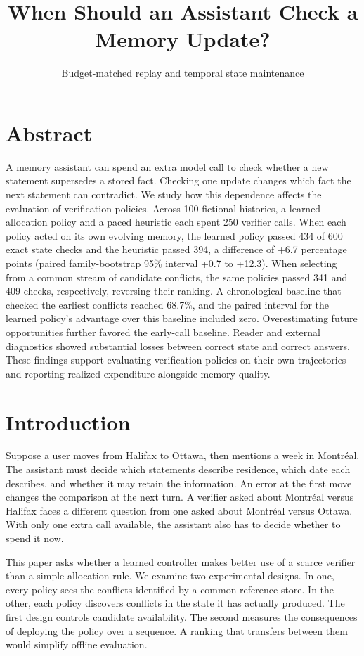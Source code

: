 \documentclass[
  11pt,
]{article}
\title{When Should an Assistant Check a Memory Update?}
\subtitle{Budget-matched replay and temporal state maintenance}
\author{}
\date{}
\begin{document}
\maketitle

\section{Abstract}\label{abstract}

A memory assistant can spend an extra model call to check whether a new
statement supersedes a stored fact. Checking one update changes which
fact the next statement can contradict. We study how this dependence
affects the evaluation of verification policies. Across 100 fictional
histories, a learned allocation policy and a paced heuristic each spent
250 verifier calls. When each policy acted on its own evolving memory,
the learned policy passed 434 of 600 exact state checks and the
heuristic passed 394, a difference of +6.7 percentage points (paired
family-bootstrap 95\% interval +0.7 to +12.3). When selecting from a
common stream of candidate conflicts, the same policies passed 341 and
409 checks, respectively, reversing their ranking. A chronological
baseline that checked the earliest conflicts reached 68.7\%, and the
paired interval for the learned policy's advantage over this baseline
included zero. Overestimating future opportunities further favored the
early-call baseline. Reader and external diagnostics showed substantial
losses between correct state and correct answers. These findings support
evaluating verification policies on their own trajectories and reporting
realized expenditure alongside memory quality.

\section{Introduction}\label{introduction}

Suppose a user moves from Halifax to Ottawa, then mentions a week in
Montréal. The assistant must decide which statements describe residence,
which date each describes, and whether it may retain the information. An
error at the first move changes the comparison at the next turn. A
verifier asked about Montréal versus Halifax faces a different question
from one asked about Montréal versus Ottawa. With only one extra call
available, the assistant also has to decide whether to spend it now.

This paper asks whether a learned controller makes better use of a
scarce verifier than a simple allocation rule. We examine two
experimental designs. In one, every policy sees the conflicts identified
by a common reference store. In the other, each policy discovers
conflicts in the state it has actually produced. The first design
controls candidate availability. The second measures the consequences of
deploying the policy over a sequence. A ranking that transfers between
them would simplify offline evaluation.
\end{document}
